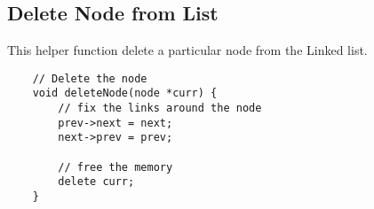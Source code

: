 \subsection{Delete Node from List}
This helper function delete a particular node from the Linked list.
\begin{lstlisting}
    // Delete the node
    void deleteNode(node *curr) {
        // fix the links around the node
        prev->next = next;
        next->prev = prev;

        // free the memory
        delete curr;
    }
\end{lstlisting}